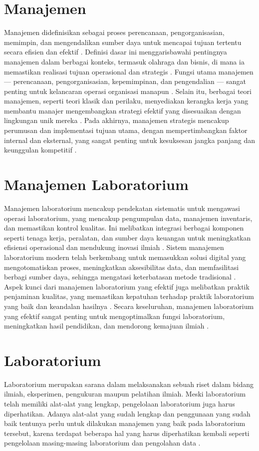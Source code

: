 \section{Manajemen}
Manajemen didefinisikan sebagai proses perencanaan, pengorganisasian, memimpin, dan mengendalikan sumber daya untuk mencapai tujuan tertentu secara efisien dan efektif \cite{kaehler2019concept}. Definisi dasar ini menggarisbawahi pentingnya manajemen dalam berbagai konteks, termasuk olahraga dan bisnis, di mana ia memastikan realisasi tujuan operasional dan strategis \cite{kaehler2019concept}. Fungsi utama manajemen — perencanaan, pengorganisasian, kepemimpinan, dan pengendalian — sangat penting untuk kelancaran operasi organisasi manapun \cite{feng2009internal}. Selain itu, berbagai teori manajemen, seperti teori klasik dan perilaku, menyediakan kerangka kerja yang membantu manajer mengembangkan strategi efektif yang disesuaikan dengan lingkungan unik mereka \cite{hussain2019management}. Pada akhirnya, manajemen strategis mencakup perumusan dan implementasi tujuan utama, dengan mempertimbangkan faktor internal dan eksternal, yang sangat penting untuk kesuksesan jangka panjang dan keunggulan kompetitif \cite{schuhly2022strategic}.

\section{Manajemen Laboratorium}
Manajemen laboratorium mencakup pendekatan sistematis untuk mengawasi operasi laboratorium, yang mencakup pengumpulan data, manajemen inventaris, dan memastikan kontrol kualitas. Ini melibatkan integrasi berbagai komponen seperti tenaga kerja, peralatan, dan sumber daya keuangan untuk meningkatkan efisiensi operasional dan mendukung inovasi ilmiah \cite{marwah2024sistem}. Sistem manajemen laboratorium modern telah berkembang untuk memasukkan solusi digital yang mengotomatiskan proses, meningkatkan aksesibilitas data, dan memfasilitasi berbagi sumber daya, sehingga mengatasi keterbatasan metode tradisional \cite{rihm2024digital}. Aspek kunci dari manajemen laboratorium yang efektif juga melibatkan praktik penjaminan kualitas, yang memastikan kepatuhan terhadap praktik laboratorium yang baik dan keandalan hasilnya \cite{kawai2021phase}. Secara keseluruhan, manajemen laboratorium yang efektif sangat penting untuk mengoptimalkan fungsi laboratorium, meningkatkan hasil pendidikan, dan mendorong kemajuan ilmiah \cite{marwah2024sistem}.

\section{Laboratorium}
Laboratorium merupakan sarana dalam melaksanakan sebuah riset dalam bidang ilmiah, eksperimen, pengukuran maupun pelatihan ilmiah. Meski laboratorium telah memiliki alat-alat yang lengkap, pengelolaan laboratorium juga harus diperhatikan. Adanya alat-alat yang sudah lengkap dan penggunaan yang sudah baik tentunya perlu untuk dilakukan manajemen yang baik pada laboratorium tersebut, karena terdapat beberapa hal yang harus diperhatikan kembali seperti pengelolaan masing-masing laboratorium dan pengolahan data \cite{sweden2022rancang}.


